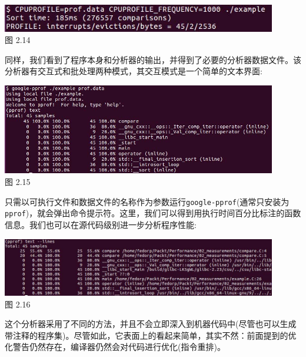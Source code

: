 \begin{center}
\includegraphics[width=0.9\textwidth]{content/1/chapter2/images/14.jpg}\\
图 2.14
\end{center}

同样，我们看到了程序本身和分析器的输出，并得到了必要的分析器数据文件。该分析器有交互式和批处理两种模式，其交互模式是一个简单的文本界面:

\begin{center}
\includegraphics[width=0.9\textwidth]{content/1/chapter2/images/15.jpg}\\
图 2.15
\end{center}

只需以可执行文件和数据文件的名称作为参数运行\texttt{google-pprof}(通常只安装为\texttt{pprof})，就会弹出命令提示符。这里，我们可以得到用执行时间百分比标注的函数信息。我们也可以在源代码级别进一步分析程序性能:

\begin{center}
\includegraphics[width=0.9\textwidth]{content/1/chapter2/images/16.jpg}\\
图 2.16
\end{center}

这个分析器采用了不同的方法，并且不会立即深入到机器代码中(尽管也可以生成带注释的程序集)。尽管如此，它表面上的看起来简单，其实不然：前面提到的优化警告仍然存在，编译器仍然会对代码进行优化(指令重排)。

